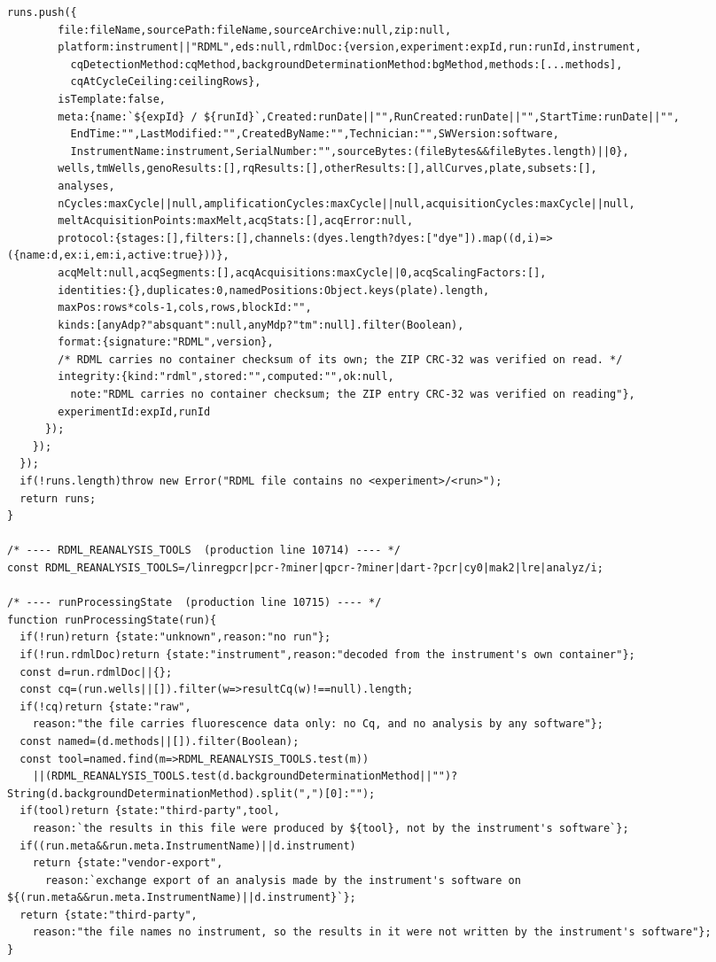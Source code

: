 \begin{multicols}{2}
\begin{lstlisting}[style=jstiny]
      runs.push({
        file:fileName,sourcePath:fileName,sourceArchive:null,zip:null,
        platform:instrument||"RDML",eds:null,rdmlDoc:{version,experiment:expId,run:runId,instrument,
          cqDetectionMethod:cqMethod,backgroundDeterminationMethod:bgMethod,methods:[...methods],
          cqAtCycleCeiling:ceilingRows},
        isTemplate:false,
        meta:{name:`${expId} / ${runId}`,Created:runDate||"",RunCreated:runDate||"",StartTime:runDate||"",
          EndTime:"",LastModified:"",CreatedByName:"",Technician:"",SWVersion:software,
          InstrumentName:instrument,SerialNumber:"",sourceBytes:(fileBytes&&fileBytes.length)||0},
        wells,tmWells,genoResults:[],rqResults:[],otherResults:[],allCurves,plate,subsets:[],
        analyses,
        nCycles:maxCycle||null,amplificationCycles:maxCycle||null,acquisitionCycles:maxCycle||null,
        meltAcquisitionPoints:maxMelt,acqStats:[],acqError:null,
        protocol:{stages:[],filters:[],channels:(dyes.length?dyes:["dye"]).map((d,i)=>({name:d,ex:i,em:i,active:true}))},
        acqMelt:null,acqSegments:[],acqAcquisitions:maxCycle||0,acqScalingFactors:[],
        identities:{},duplicates:0,namedPositions:Object.keys(plate).length,
        maxPos:rows*cols-1,cols,rows,blockId:"",
        kinds:[anyAdp?"absquant":null,anyMdp?"tm":null].filter(Boolean),
        format:{signature:"RDML",version},
        /* RDML carries no container checksum of its own; the ZIP CRC-32 was verified on read. */
        integrity:{kind:"rdml",stored:"",computed:"",ok:null,
          note:"RDML carries no container checksum; the ZIP entry CRC-32 was verified on reading"},
        experimentId:expId,runId
      });
    });
  });
  if(!runs.length)throw new Error("RDML file contains no <experiment>/<run>");
  return runs;
}

/* ---- RDML_REANALYSIS_TOOLS  (production line 10714) ---- */
const RDML_REANALYSIS_TOOLS=/linregpcr|pcr-?miner|qpcr-?miner|dart-?pcr|cy0|mak2|lre|analyz/i;

/* ---- runProcessingState  (production line 10715) ---- */
function runProcessingState(run){
  if(!run)return {state:"unknown",reason:"no run"};
  if(!run.rdmlDoc)return {state:"instrument",reason:"decoded from the instrument's own container"};
  const d=run.rdmlDoc||{};
  const cq=(run.wells||[]).filter(w=>resultCq(w)!==null).length;
  if(!cq)return {state:"raw",
    reason:"the file carries fluorescence data only: no Cq, and no analysis by any software"};
  const named=(d.methods||[]).filter(Boolean);
  const tool=named.find(m=>RDML_REANALYSIS_TOOLS.test(m))
    ||(RDML_REANALYSIS_TOOLS.test(d.backgroundDeterminationMethod||"")?String(d.backgroundDeterminationMethod).split(",")[0]:"");
  if(tool)return {state:"third-party",tool,
    reason:`the results in this file were produced by ${tool}, not by the instrument's software`};
  if((run.meta&&run.meta.InstrumentName)||d.instrument)
    return {state:"vendor-export",
      reason:`exchange export of an analysis made by the instrument's software on ${(run.meta&&run.meta.InstrumentName)||d.instrument}`};
  return {state:"third-party",
    reason:"the file names no instrument, so the results in it were not written by the instrument's software"};
}


\end{lstlisting}
\end{multicols}
